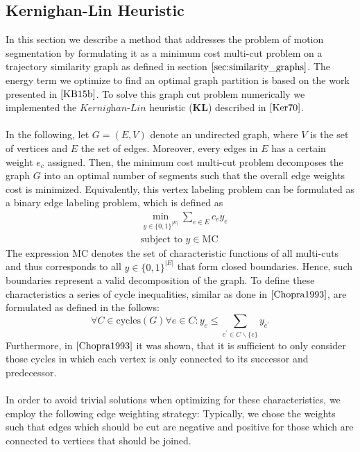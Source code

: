 \subsection{Kernighan-Lin Heuristic} 
In this section we describe a method that addresses the problem of motion segmentation by formulating it as a minimum cost multi-cut problem on a trajectory similarity graph as defined in section $\ref{sec:similarity_graphs}$. The energy term we optimize to find an optimal graph partition is based on the work presented in $\cite{KB15b}$. To solve this graph cut problem numerically we implemented the $\textit{Kernighan-Lin}$ heuristic ($\textbf{KL}$) described in $\cite{Ker70}$. \\ \\
In the following, let $G = (E, V)$ denote an undirected graph, where $V$ is the set of vertices and $E$ the set of edges. Moreover, every edges in $E$ has a certain weight $e_c$ assigned. Then, the minimum cost multi-cut problem decomposes the graph $G$ into an optimal number of segments such that the overall edge weights cost is minimized. Equivalently, this vertex labeling problem can be formulated as a binary edge labeling problem, which is defined as
\begin{equation}
\begin{aligned}
& \min_{y \in \{0,1 \}^{|E|}} \sum_{e \in E} c_e y_e \\
& \text{subject to } y \in \text{MC}
\end{aligned}
\end{equation}
The expression $\text{MC}$ denotes the set of characteristic functions of all multi-cuts and thus corresponds to all $y \in \{0,1 \}^{|E|}$ that form closed boundaries. Hence, such boundaries represent a valid decomposition of the graph. To define these characteristics a series of cycle inequalities, similar as done in $\cite{Chopra1993}$, are formulated as defined in the follows:
\begin{equation}
	\forall C \in \text{cycles}(G) \forall e \in C: y_e \leq \sum_{e^{'} \in C \backslash \{e\}} y_{e^{'}}
\end{equation}
Furthermore, in $\cite{Chopra1993}$ it was shown, that it is sufficient to only consider those cycles in which each vertex is only connected to its successor and predecessor. \\ \\
In order to avoid trivial solutions when optimizing for these characteristics, we employ the following edge weighting strategy: Typically, we chose the weights such that edges which should be cut are negative and positive for those which are connected to vertices that should be joined.

